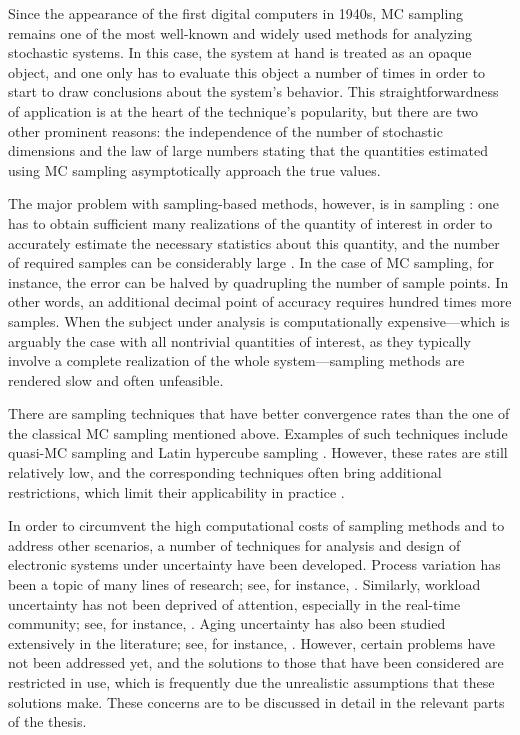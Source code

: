 Since the appearance of the first digital computers in 1940s, \ac{MC} sampling
remains one of the most well-known and widely used methods for analyzing
stochastic systems. In this case, the system at hand is treated as an opaque
object, and one only has to evaluate this object a number of times in order to
start to draw conclusions about the system's behavior. This straightforwardness
of application is at the heart of the technique's popularity, but there are two
other prominent reasons: the independence of the number of stochastic dimensions
and the law of large numbers \cite{durrett2010} stating that the quantities
estimated using \ac{MC} sampling asymptotically approach the true values.

The major problem with sampling-based methods, however, is in sampling \perse:
one has to obtain sufficient many realizations of the quantity of interest in
order to accurately estimate the necessary statistics about this quantity, and
the number of required samples can be considerably large
\cite{diaz-emparanza2002}. In the case of \ac{MC} sampling, for instance, the
error can be halved by quadrupling the number of sample points. In other words,
an additional decimal point of accuracy requires hundred times more samples.
When the subject under analysis is computationally expensive---which is arguably
the case with all nontrivial quantities of interest, as they typically involve a
complete realization of the whole system---sampling methods are rendered slow
and often unfeasible.

There are sampling techniques that have better convergence rates than the one of
the classical \ac{MC} sampling mentioned above. Examples of such techniques
include quasi-\ac{MC} sampling and Latin hypercube sampling \cite{asmussen2007}.
However, these rates are still relatively low, and the corresponding techniques
often bring additional restrictions, which limit their applicability in practice
\cite{xiu2010}.

In order to circumvent the high computational costs of sampling methods and to
address other scenarios, a number of techniques for analysis and design of
electronic systems under uncertainty have been developed. Process variation has
been a topic of many lines of research; see, for instance, \cite{bhardwaj2006,
bhardwaj2008, chandra2010, juan2012, lee2013}. Similarly, workload uncertainty
has not been deprived of attention, especially in the real-time community; see,
for instance, \cite{diaz2002, santinelli2011, quinton2012, tanasa2015}. Aging
uncertainty has also been studied extensively in the literature; see, for
instance, \cite{coskun2006, huang2009b, firouzi2013, das2014c}. However, certain
problems have not been addressed yet, and the solutions to those that have been
considered are restricted in use, which is frequently due the unrealistic
assumptions that these solutions make. These concerns are to be discussed in
detail in the relevant parts of the thesis.
